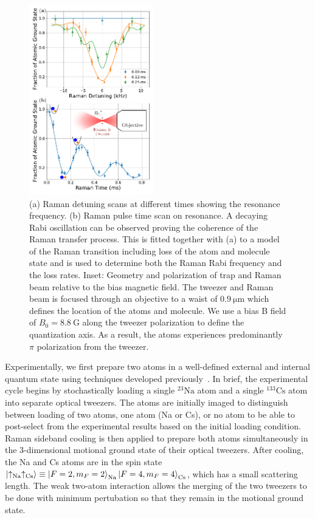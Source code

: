 \documentclass[aps,prl,twocolumn,10pt,superscriptaddress]{revtex4-1}
\newcommand{\Na}{\mathrm{Na}}
\newcommand{\Cs}{\mathrm{Cs}}
\begin{document}
\begin{figure}[ht!]
  \includegraphics[width=0.48\textwidth]{fig2.pdf}
  \caption{
    (a) Raman detuning scans at different times showing the resonance frequency.
    (b) Raman pulse time scan on resonance.
    A decaying Rabi oscillation can be observed proving the coherence of
    the Raman transfer process.
    This is fitted together with (a) to a model of the Raman transition including loss of the atom and molecule state and is used to determine
    both the Raman Rabi frequency and the loss rates.
    Inset: Geometry and polarization of trap and Raman beam relative to the bias magnetic field.
    The tweezer and Raman beam is focused through an objective to a waist of $0.9~\mathrm{\mu m}$
    which defines the location of the atoms and molecule.
    We use a bias B field of $B_0=8.8~\mathrm{G}$ along the tweezer polarization
    to define the quantization axis.
    As a result, the atoms experiences predominantly $\pi$ polarization from the tweezer.
    \label{f-raman}}
\end{figure}




Experimentally, we first prepare two atoms in a well-defined external and internal quantum state
using techniques developed previously~\cite{Liu2018, Liu2019, Wang2019}.
In brief, the experimental cycle begins by stochastically loading a single ${}^{23}\Na$ atom
and a single ${}^{133}\Cs$ atom into separate optical tweezers.
The atoms are initially imaged to distinguish between loading of two atoms,
one atom (Na or Cs), or no atom to be able to post-select from the experimental results
based on the initial loading condition.
Raman sideband cooling is then applied to prepare both atoms simultaneously
in the 3-dimensional motional ground state of their optical tweezers.
After cooling, the Na and Cs atoms are in the spin state~$\ket{\uparrow_{\Na}\uparrow_{\Cs}}\equiv \ket{F=2,m_F=2}_{\Na}\ket{F=4,m_F=4}_{\Cs}$,
which has a small scattering length.
The weak two-atom interaction allows the merging of the two tweezers to be done
with minimum pertubation so that they remain in the motional ground state.
\end{document}
